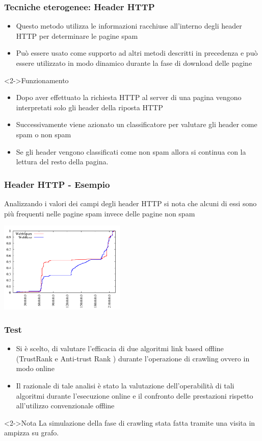 \documentclass{beamer}
\begin{document}
\begin{frame}
  \frametitle{Tecniche eterogenee: Header HTTP}
\begin{itemize}
 \item Questo metodo utilizza le informazioni racchiuse all’interno degli header HTTP per determinare le pagine spam
 \item Può essere usato come supporto ad altri metodi descritti in precedenza e può essere utilizzato in modo dinamico durante la fase di download delle pagine
\end{itemize}
\begin{block}<2->{Funzionamento}
 \begin{itemize}
  \item Dopo aver effettuato la richiesta HTTP al server di una pagina vengono interpretati solo gli header della riposta HTTP
  \item Successivamente viene azionato un classificatore per valutare gli header come spam o non spam
  \item Se gli header vengono classificati come non spam allora si continua con la lettura del resto della pagina.
 \end{itemize}
\end{block}
\end{frame}
\begin{frame}
  \frametitle{Header HTTP - Esempio}
  Analizzando i valori dei campi degli header HTTP si nota che alcuni di essi sono più frequenti nelle pagine spam invece delle pagine non spam
\begin{center}
 \includegraphics[width=6cm]{immagini/altre/webb}
\end{center}
\end{frame}
\begin{frame}
  \frametitle{Test}
  \begin{itemize}
   \item Si è scelto, di valutare l’efficacia di due algoritmi link based offline (TrustRank e Anti-trust Rank ) durante l’operazione di crawling ovvero in modo online
   \item Il razionale di tale analisi è stato la valutazione dell’operabilità di tali algoritmi durante l’esecuzione online e
il confronto delle prestazioni rispetto all’utilizzo convenzionale offline
  \end{itemize}
  \begin{block}<2->{Nota}
   La simulazione della fase di crawling  stata fatta tramite una visita in ampizza su grafo.
  \end{block}
\end{frame}
\end{document}
